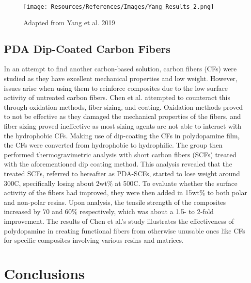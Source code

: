 \documentclass[12pt]{article}
\begin{document}
\begin{multicols}{2}
\begin{figure}[H]
    \centering
    \texttt{[image: Resources/References/Images/Yang\_Results\_2.png]}
    \caption{\scriptsize{Adapted from Yang et al. 2019 \citep{Yang2019}}}
    \label{fig:Yang_Results_2}
\end{figure}

\subsection{PDA Dip-Coated Carbon Fibers}

\indent In an attempt to find another carbon-based solution, carbon fibers (CFs) were studied as they have excellent mechanical properties and low weight. However, issues arise when using them to reinforce composites due to the low surface activity of untreated carbon fibers. Chen et al. \citep{ShushengChen2014} attempted to counteract this through oxidation methods, fiber sizing, and coating. Oxidation methods proved to not be effective as they damaged the mechanical properties of the fibers, and fiber sizing proved ineffective as most sizing agents are not able to interact with the hydrophobic CFs. Making use of dip-coating the CFs in polydopamine film, the CFs were converted from hydrophobic to hydrophilic. \citep{ShushengChen2014} The group then performed thermogravimetric analysis with short carbon fibers (SCFs) treated with the aforementioned dip coating method. This analysis revealed that the treated SCFs, referred to hereafter as PDA-SCFs, started to lose weight around 300\degree C, specifically losing about 2wt\% at 500\degree C. \citep{ShushengChen2014} To evaluate whether the surface activity of the fibers had improved, they were then added in 15wt\% to both polar and non-polar resins. Upon analysis, the tensile strength of the composites increased by 70 and 60\% respectively, which was about a 1.5- to 2-fold improvement. \citep{ShushengChen2014} The results of Chen et al.'s \citep{ShushengChen2014} study illustrates the effectiveness of polydopamine in creating functional fibers from otherwise unusable ones like CFs for specific composites involving various resins and matrices. 

\section{Conclusions}


\end{multicols}
\end{document}
